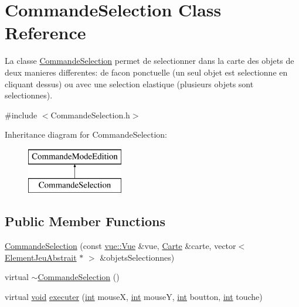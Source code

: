 \hypertarget{class_commande_selection}{\section{Commande\-Selection Class Reference}
\label{class_commande_selection}
}


La classe \hyperlink{class_commande_selection}{Commande\-Selection} permet de selectionner dans la carte des objets de deux manieres differentes\-: de facon ponctuelle (un seul objet est selectionne en cliquant dessus) ou avec une selection elastique (plusieurs objets sont selectionnes).  




{\ttfamily \#include $<$Commande\-Selection.\-h$>$}

Inheritance diagram for Commande\-Selection\-:\begin{figure}[H]
\begin{center}
\leavevmode
\includegraphics[height=2.000000cm]{class_commande_selection}
\end{center}
\end{figure}
\subsection*{Public Member Functions}
\begin{DoxyCompactItemize}
\item 
\hyperlink{class_commande_selection_a144fe79ec6aefd6f1e684f71c2eb7dc8}{Commande\-Selection} (const \hyperlink{classvue_1_1_vue}{vue\-::\-Vue} \&vue, \hyperlink{class_carte}{Carte} \&carte, vector$<$ \hyperlink{class_element_jeu_abstrait}{Element\-Jeu\-Abstrait} $\ast$ $>$ \&objets\-Selectionnes)
\item 
virtual \hyperlink{class_commande_selection_a3c35456e80063269a01c2057fd96e82f}{$\sim$\-Commande\-Selection} ()
\item 
virtual \hyperlink{wglew_8h_aeea6e3dfae3acf232096f57d2d57f084}{void} \hyperlink{class_commande_selection_a1fdf079ab482bbcceb87a7d2eb72c7be}{executer} (\hyperlink{wglew_8h_a500a82aecba06f4550f6849b8099ca21}{int} mouse\-X, \hyperlink{wglew_8h_a500a82aecba06f4550f6849b8099ca21}{int} mouse\-Y, \hyperlink{wglew_8h_a500a82aecba06f4550f6849b8099ca21}{int} boutton, \hyperlink{wglew_8h_a500a82aecba06f4550f6849b8099ca21}{int} touche)
\end{DoxyCompactItemize}
